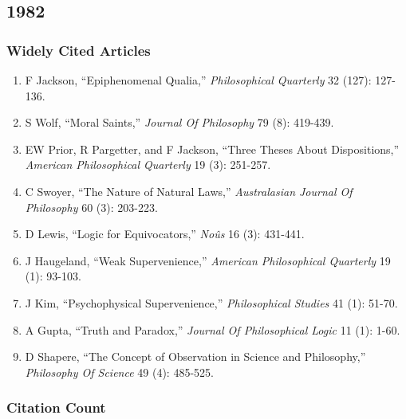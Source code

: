 \documentclass[
  10pt,
  letterpaper,
  DIV=11,
  numbers=noendperiod,
  twoside]{scrartcl}
\providecommand{\tightlist}{%
  \setlength{\itemsep}{0pt}\setlength{\parskip}{0pt}}\usepackage{longtable,booktabs,array}
\begin{document}
\newpage

\subsection{1982}\label{sec-s1982}

\subsubsection*{Widely Cited Articles}\label{widely-cited-articles-6}

\begin{enumerate}
\def\labelenumi{\arabic{enumi}.}
\tightlist
\item
  F Jackson, ``Epiphenomenal Qualia,'' \emph{Philosophical Quarterly} 32
  (127): 127-136.
\item
  S Wolf, ``Moral Saints,'' \emph{Journal Of Philosophy} 79 (8):
  419-439.
\item
  EW Prior, R Pargetter, and F Jackson, ``Three Theses About
  Dispositions,'' \emph{American Philosophical Quarterly} 19 (3):
  251-257.
\item
  C Swoyer, ``The Nature of Natural Laws,'' \emph{Australasian Journal
  Of Philosophy} 60 (3): 203-223.
\item
  D Lewis, ``Logic for Equivocators,'' \emph{Noûs} 16 (3): 431-441.
\item
  J Haugeland, ``Weak Supervenience,'' \emph{American Philosophical
  Quarterly} 19 (1): 93-103.
\item
  J Kim, ``Psychophysical Supervenience,'' \emph{Philosophical Studies}
  41 (1): 51-70.
\item
  A Gupta, ``Truth and Paradox,'' \emph{Journal Of Philosophical Logic}
  11 (1): 1-60.
\item
  D Shapere, ``The Concept of Observation in Science and Philosophy,''
  \emph{Philosophy Of Science} 49 (4): 485-525.
\end{enumerate}

\subsubsection*{Citation Count}\label{sec-count-1982}
\end{document}
